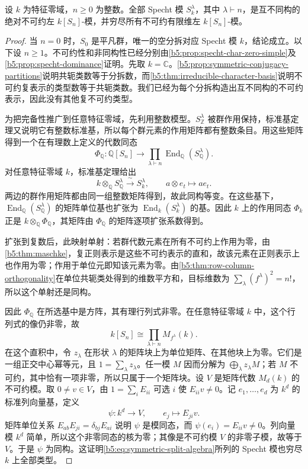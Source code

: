 \begin{theorem}[对称群的不可约分类]\label{b5:thm:specht-classification}
	设 \(k\) 为特征零域，\(n\geq0\) 为整数。全部 Specht 模 \(S_k^\lambda\)，其中 \(\lambda\vdash n\)，是互不同构的绝对不可约左 \(k[S_n]\)-模，并穷尽所有不可约有限维左 \(k[S_n]\)-模。
\end{theorem}
\begin{proof}
	当 \(n=0\) 时，\(S_0\) 是平凡群，唯一的空分拆对应 Specht 模 \(k\)，结论成立。以下设 \(n\geq1\)。不可约性和非同构性已经分别由\cref{b5:prop:specht-char-zero-simple}及\cref{b5:prop:specht-dominance}证明。先取 \(k=\mathbb C\)。\cref{b5:prop:symmetric-conjugacy-partitions}说明共轭类数等于分拆数，而\cref{b5:thm:irreducible-character-basis}说明不可约复表示的类型数等于共轭类数。我们已经为每个分拆构造出互不同构的不可约表示，因此没有其他复不可约类型。

	为把完备性推广到任意特征零域，先利用整数模型。\(S_{\mathbb Z}^\lambda\) 被群作用保持，标准基定理又说明它有整数标准基，所以每个群元素的作用矩阵都有整数条目。用这些矩阵得到一个在有理数上定义的代数同态
	\[
		\Phi_{\mathbb Q}:\mathbb Q[S_n]\longrightarrow \prod_{\lambda\vdash n} \operatorname{End}_{\mathbb Q}(S_{\mathbb Q}^\lambda).
	\]
	对任意特征零域 \(k\)，标准基定理给出
	\[
		k\otimes_{\mathbb Q}S_{\mathbb Q}^\lambda \xrightarrow{\ \sim\ }S_k^\lambda, \qquad a\otimes e_t\longmapsto ae_t.
	\]
	两边的群作用矩阵都由同一组整数矩阵得到，故此同构等变。在这些基下，\(\operatorname{End}_{\mathbb Q}(S_{\mathbb Q}^\lambda)\) 的矩阵单位基也扩张为 \(\operatorname{End}_k(S_k^\lambda)\) 的基。因此 \(k\) 上的作用同态 \(\Phi_k\) 正是 \(k\otimes_{\mathbb Q}\Phi_{\mathbb Q}\)，其矩阵由 \(\Phi_{\mathbb Q}\) 的矩阵逐项扩张系数得到。

	扩张到复数后，此映射单射：若群代数元素在所有不可约上作用为零，由\cref{b5:thm:maschke}，复正则表示是这些不可约表示的直和，故该元素在正则表示上也作用为零；作用于单位元即知该元素为零。由\cref{b5:thm:row-column-orthogonality}在单位共轭类处得到的维数平方和，目标维数为 \(\sum_\lambda(f^\lambda)^2=n!\)，所以这个单射还是同构。

	因此 \(\Phi_{\mathbb Q}\) 在所选基中是方阵，其有理行列式非零。在任意特征零域 \(k\) 中，这个行列式的像仍非零，故
	\begin{equation}\label{b5:eq:symmetric-split-algebra}
		k[S_n]\cong\prod_{\lambda\vdash n}M_{f^\lambda}(k).
	\end{equation}
	在这个直积中，令 \(z_\lambda\) 在形状 \(\lambda\) 的矩阵块上为单位矩阵、在其他块上为零。它们是一组正交中心幂等元，且 \(1=\sum_\lambda z_\lambda\)。任一模 \(M\) 因而分解为 \(\bigoplus_\lambda z_\lambda M\)；若 \(M\) 不可约，其中恰有一项非零，所以只属于一个矩阵块。设 \(V\) 是矩阵代数 \(M_d(k)\) 的不可约模。取 \(0\ne v\in V\)，由 \(1=\sum_iE_{ii}\) 可选 \(i\) 使 \(E_{ii}v\ne0\)。记 \(e_1,\ldots,e_d\) 为 \(k^d\) 的标准列向量基，定义
	\[
		\psi:k^d\longrightarrow V, \qquad e_j\longmapsto E_{ji}v.
	\]
	矩阵单位关系 \(E_{ab}E_{ji}=\delta_{bj}E_{ai}\) 说明 \(\psi\) 是模同态，而 \(\psi(e_i)=E_{ii}v\ne0\)。列向量模 \(k^d\) 简单，所以这个非零同态的核为零；其像是不可约模 \(V\) 的非零子模，故等于 \(V\)。于是 \(\psi\) 为同构。这证明\eqref{b5:eq:symmetric-split-algebra}所列的 Specht 模也穷尽 \(k\) 上全部类型。
\end{proof}

